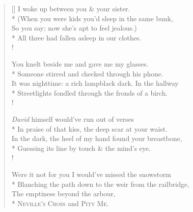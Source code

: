 \settowidth{\versewidth}{In the dark, the heel of my hand found your breastbone,}
\begin{verse}[\versewidth]
I woke up between you \& your sister.\\*
\vin (When you were kids you'd sleep in the same bunk,\\
So you say; now she's apt to feel jealous.)\\*
\vin All three had fallen asleep in our clothes.\\!

You knelt beside me and gave me my glasses.\\*
\vin Someone stirred and checked through his phone.\\
It was nighttime: a rich lampblack dark. In the hallway\\*
\vin Streetlights fondled through the fronds of a birch.\\!

\emph{David} himself would've run out of verses\\*
\vin In praise of that kiss, the deep scar at your waist.\\
In the dark, the heel of my hand found your breastbone,\\*
\vin Guessing its line by touch \& the mind's eye.\\!

Were it not for you I would've missed the snowstorm\\*
\vin Blanching the path down to the weir from the railbridge,\nobreak\\
The emptiness beyond the arbour,\\*
\vin \textsc{Neville}'\textsc{s Cross} and \textsc{Pity Me}.
\end{verse}
